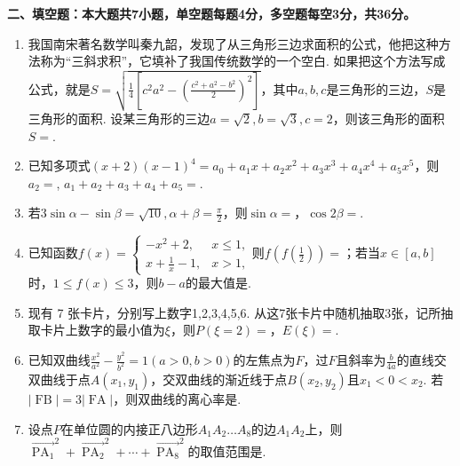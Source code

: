 \documentclass[UTF8]{ctexart}
\newcommand{\tmop}[1]{\ensuremath{\operatorname{#1}}}
\newcommand{\tmstrong}[1]{\textbf{#1}}
\begin{document}
{\tmstrong{二、填空题：本大题共7小题，单空题每题4分，多空题每空3分，共36分。}}
\begin{enumerate}
  \item
  我国南宋著名数学叫秦九韶，发现了从三角形三边求面积的公式，他把这种方法称为``三斜求积''，它填补了我国传统数学的一个空白.
  如果把这个方法写成公式，就是$S = \sqrt{\frac{1}{4} \left[ c^2
  a^2 - \left( \frac{c^2 + a^2 - b^2}{2} \right)^2 \right]}$，其中$a, b,
  c$是三角形的三边，$S$是三角形的面积.
  设某三角形的三边$a = \sqrt{2}, b = \sqrt{3}, c =
  2$，则该三角形的面积$S =${\underline{{\hspace{3em}}}}.
  
  \item 已知多项式$(x + 2) (x - 1)^4 = a_0 + a_1 x + a_2 x^2 + a_3 x^3 +
  a_4 x^4 + a_5 x^5$，则$a_2 =${\underline{{\hspace{3em}}}}, $a_1 + a_2 +
  a_3 + a_4 + a_5 =${\underline{{\hspace{3em}}}}.
  
  \item 若$3 \sin \alpha - \sin \beta = \sqrt{10}, \alpha + \beta =
  \frac{\pi}{2}$，则$\sin \alpha =${\underline{{\hspace{3em}}}}，$\cos 2
  \beta =${\underline{{\hspace{3em}}}}.
  
  \item 已知函数$f (x) = \left\{\begin{array}{ll}
    - x^2 + 2, & x \leqslant 1,\\
    x + \frac{1}{x} - 1, & x > 1,
  \end{array}\right.$则$f \left( f \left( \frac{1}{2} \right) \right)
  =${\underline{{\hspace{3em}}}}；若当$x \in [a, b]$时，$1 \leqslant f
  (x) \leqslant 3$，则$b - a$的最大值是{\underline{{\hspace{3em}}}}.
  
  \item 现有 7 张卡片，分别写上数字1,2,3,4,5,6.
  从这7张卡片中随机抽取3张，记所抽取卡片上数字的最小值为$\xi$，则$P
  (\xi = 2) =${\underline{{\hspace{3em}}}}，$E (\xi)
  =${\underline{{\hspace{3em}}}}.
  
  \item 已知双曲线$\frac{x^2}{a^2} - \frac{y^2}{b^2} = 1 (a > 0, b >
  0)$的左焦点为$F$，过$F$且斜率为$\frac{b}{4
  a}$的直线交双曲线于点$A (x_1,
  y_1)$，交双曲线的渐近线于点$B (x_2, y_2)$且$x_1 < 0 < x_2$.
  若$| \tmop{FB} | = 3 | \tmop{FA}
  |$，则双曲线的离心率是{\underline{{\hspace{3em}}}}.
  
  \item 设点$P$在单位圆的内接正八边形$A_1 A_2 \ldots
  A_8$的边$A_1 A_2$上，则$\overrightarrow{\tmop{PA}_1}^2 +
  \overrightarrow{\tmop{PA}_2}^2 + \cdots +
  \overrightarrow{\tmop{PA}_8}^2$的取值范围是{\underline{{\hspace{3em}}}}.
\end{enumerate}
\end{document}
